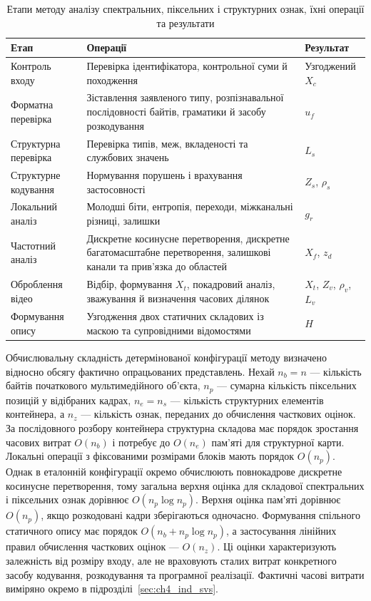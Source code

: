 \begin{table}[H]
\centering
\caption{Етапи методу аналізу спектральних, піксельних і структурних ознак, їхні операції та результати}
\label{tab:ch3_svs_stages}
\footnotesize
\renewcommand{\arraystretch}{0.96}
\setlength{\tabcolsep}{4pt}
\begin{tabularx}{\textwidth}{@{}>{\raggedright\arraybackslash}p{}>{\raggedright\arraybackslash}p{}Y@{}}
\toprule
\textbf{Етап} & \textbf{Операції} & \textbf{Результат} \\
\midrule
Контроль входу & Перевірка ідентифікатора, контрольної суми й походження & Узгоджений $X_c$ \\
Форматна перевірка & Зіставлення заявленого типу, розпізнавальної послідовності байтів, граматики й засобу розкодування & $u_f$ \\
Структурна перевірка & Перевірка типів, меж, вкладеності та службових значень & $L_s$ \\
Структурне кодування & Нормування порушень і врахування застосовності & $Z_s$, $\rho_s$ \\
Локальний аналіз & Молодші біти, ентропія, переходи, міжканальні різниці, залишки & $g_r$ \\
Частотний аналіз & Дискретне косинусне перетворення, дискретне багатомасштабне перетворення, залишкові канали та прив’язка до областей & $X_f$, $z_d$ \\
Оброблення відео & Відбір, формування $X_t$, покадровий аналіз, зважування й визначення часових ділянок & $X_t$, $Z_v$, $\rho_v$, $L_v$ \\
Формування опису & Узгодження двох статичних складових із маскою та супровідними відомостями & $H$ \\
\bottomrule
\end{tabularx}
\end{table}

Обчислювальну складність детермінованої конфігурації методу визначено відносно обсягу фактично опрацьованих представлень. Нехай $n_b=n$ --- кількість байтів початкового мультимедійного об’єкта, $n_p$ --- сумарна кількість піксельних позицій у відібраних кадрах, $n_e=n_s$ --- кількість структурних елементів контейнера, а $n_z$ --- кількість ознак, переданих до обчислення часткових оцінок. За послідовного розбору контейнера структурна складова має порядок зростання часових витрат $O(n_b)$ і потребує до $O(n_e)$ пам’яті для структурної карти. Локальні операції з фіксованими розмірами блоків мають порядок $O(n_p)$. Однак в еталонній конфігурації окремо обчислюють повнокадрове дискретне косинусне перетворення, тому загальна верхня оцінка для складової спектральних і піксельних ознак дорівнює $O(n_p\log n_p)$. Верхня оцінка пам’яті дорівнює $O(n_p)$, якщо розкодовані кадри зберігаються одночасно. Формування спільного статичного опису має порядок $O(n_b+n_p\log n_p)$, а застосування лінійних правил обчислення часткових оцінок --- $O(n_z)$. Ці оцінки характеризують залежність від розміру входу, але не враховують сталих витрат конкретного засобу кодування, розкодування та програмної реалізації. Фактичні часові витрати виміряно окремо в підрозділі~\ref{sec:ch4_ind_svs}.

